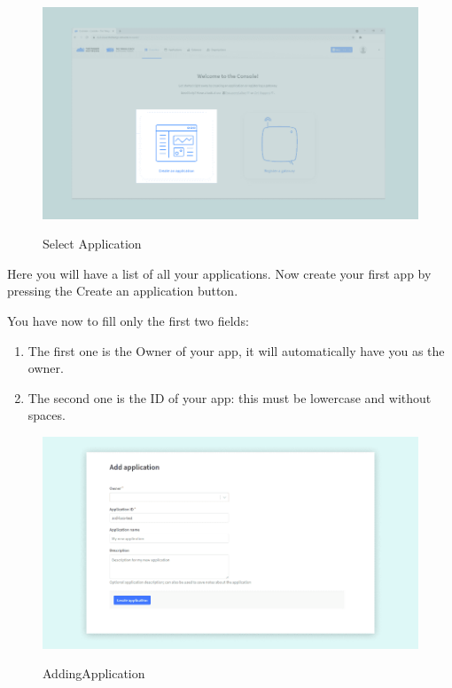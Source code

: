 \begin{itemize}
	\begin{figure}
		\begin{center}
			\includegraphics[width=0.7\linewidth]{Images/LORA/SelectApplication.png}
			\caption{Select Application}
			\label{Select Application} \cite{connecting_to_ttn_portenta_vision_shield:2024}
		\end{center}
	\end{figure}
	
	Here you will have a list of all your applications. Now create your first app by pressing the Create an application button.
	
	You have now to fill only the first two fields:
	
	\begin{enumerate}
		\item The first one is the Owner of your app, it will automatically have you as the owner.
		\item The second one is the ID of your app: this must be lowercase and without spaces.
	\end{enumerate}
	
	\begin{figure}
		\begin{center}
			\includegraphics[width=0.7\linewidth]{Images/LORA/AddingApplication.png}
			\caption{AddingApplication}
			\label{AddingApplication} \cite{connecting_to_ttn_portenta_vision_shield:2024}
		\end{center}
	\end{figure}
	

\end{itemize}
